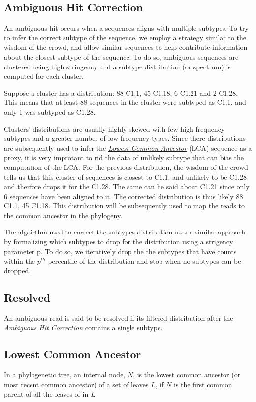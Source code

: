 \documentclass[letterpaper,10pt,english]{sphinxmanual}
\begin{document}
\subsection{Ambiguous Hit Correction}
\label{defs:multiple-hits}\label{defs:ambiguous-hit-correction}
An ambiguous hit occurs when a sequences aligns with multiple subtypes. To try to infer the correct subtype of
the sequence, we employ a strategy similar to the wisdom of the crowd, and allow similar sequences to help contribute
information about the closest subtype of the sequence. To do so, ambiguous sequences are clustered using high stringency
and a subtype distribution (or spectrum) is computed for each cluster.

Suppose a cluster has a distribution:
88 C1.1, 45 C1.18, 6 C1.21 and 2 C1.28. This means that at least 88 sequences in the cluster were subtyped as C1.1. and only 1
was subtyped as C1.28.

Clusters' distributions are usually highly skewed with few high
frequency subtypes and a greater number of low frequency types.  Since
there distributions are subsequently used to infer the {\hyperref[defs:lca]{\emph{Lowest Common Ancestor}}}
(LCA) sequence as a proxy, it is very improtant to rid the data of
unlikely subtype that can bias the computation of the LCA. For the
previous distribution, the wisdom of the crowd tells us that this
cluster of sequences is closest to C1.1. and unlikely to be C1.28 and
therfore drops it for the C1.28. The same can be said about C1.21
since only 6 sequences have been aligned to it.  The corrected
distribution is thus likely 88 C1.1, 45 C1.18. This distribution will
be subsequently used to map the reads to the common ancestor in the
phylogeny.

The algoirthm used to correct the subtypes distribution uses a similar
approach by formalizing which subtypes to drop for the distribution
using a strigency parameter p. To do so, we iteratively drop the
the subtypes that have counts within the \(p^{th}\) percentile of the distribution and stop
when no subtypes can be dropped.


\subsection{Resolved}
\label{defs:resolved}\label{defs:id9}
An ambiguous read is said to be resolved if its filtered distribution after the {\hyperref[defs:multiple-hits]{\emph{Ambiguous Hit Correction}}} contains a single subtype.


\subsection{Lowest Common Ancestor}
\label{defs:lowest-common-ancestor}\label{defs:lca}
In a phylogenetic tree, an internal node, \(N\), is the lowest common ancestor (or most recent common ancestor) of a set of leaves \(L\), if \(N\) is the first common parent of all the leaves of in \(L\)
\end{document}
